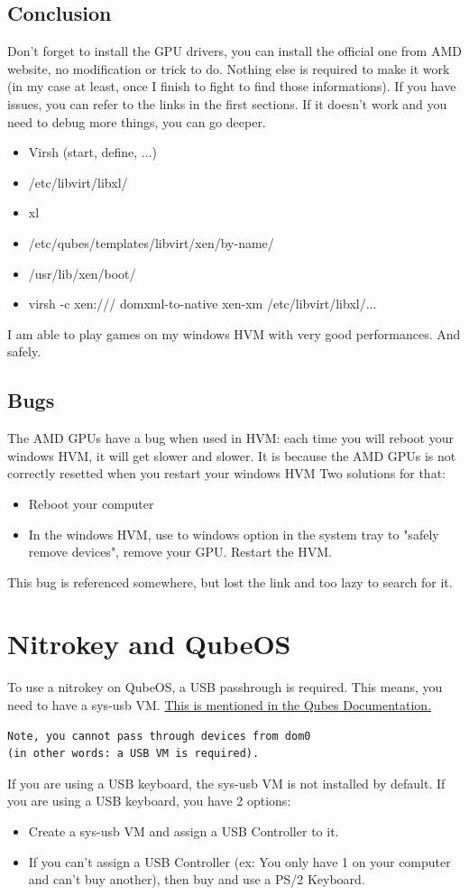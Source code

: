 \documentclass[12pt]{article}
\begin{document}
\subsection{Conclusion}
Don't forget to install the GPU drivers, you can install the official one from AMD website, no modification or trick to do.
Nothing else is required to make it work (in my case at least, once I finish to fight to find those informations).
If you have issues, you can refer to the links in the first sections.
If it doesn't work and you need to debug more things, you can go deeper.
\begin{itemize}
\item Virsh (start, define, ...)
\item /etc/libvirt/libxl/
\item xl
\item /etc/qubes/templates/libvirt/xen/by-name/
\item /usr/lib/xen/boot/
\item virsh -c xen:/// domxml-to-native xen-xm /etc/libvirt/libxl/...
\end{itemize}

I am able to play games on my windows HVM with very good performances.
And safely.

\subsection{Bugs}
The AMD GPUs have a bug when used in HVM:
each time you will reboot your windows HVM, it will get slower and slower.
It is because the AMD GPUs is not correctly resetted when you restart your windows HVM
Two solutions for that:
\begin{itemize}
\item Reboot your computer
\item In the windows HVM, use to windows option in the system tray to "safely remove devices", remove your GPU. Restart the HVM.
\end{itemize}

This bug is referenced somewhere, but lost the link and too lazy to search for it.

\section{Nitrokey and QubeOS}
To use a nitrokey on QubeOS, a USB passhrough is required.
This means, you need to have a sys-usb VM.
\href{https://www.qubes-os.org/doc/usb/\#attaching-a-single-usb-device-to-a-qube-usb-passthrough}{This is mentioned in the Qubes Documentation.}
\begin{verbatim}
Note, you cannot pass through devices from dom0
(in other words: a USB VM is required).
\end{verbatim}
If you are using a USB keyboard, the sys-usb VM is not installed by default.
If you are using a USB keyboard, you have 2 options:
\begin{itemize}
\item Create a sys-usb VM and assign a USB Controller to it.
\item If you can't assign a USB Controller (ex: You only have 1 on your computer and can't buy another), then buy and use a PS/2 Keyboard.
\end{itemize}
\end{document}

